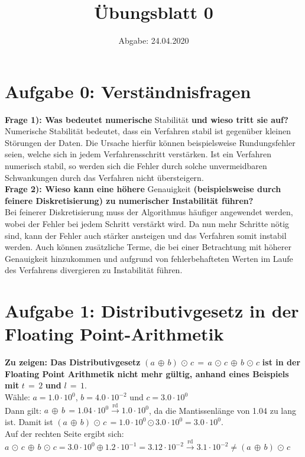 

\subject{Computational Physics}
\title{Übungsblatt 0}
\date{%
  Abgabe: 24.04.2020
}



\maketitle
\thispagestyle{empty}
\newpage

\section*{Aufgabe 0: Verständnisfragen}

\textbf{Frage 1): Was bedeutet numerische} Stabilität \textbf{und wieso tritt sie auf?}\\
Numerische Stabilität bedeutet, dass ein Verfahren stabil ist gegenüber kleinen Störungen der Daten. Die Ursache hierfür können beispielsweise Rundungsfehler seien, welche sich in jedem Verfahrensschritt verstärken. Ist ein Verfahren numerisch stabil, so werden sich die Fehler durch solche unvermeidbaren
Schwankungen durch das Verfahren nicht übersteigern. \\
\textbf{Frage 2): Wieso kann eine höhere} Genauigkeit \textbf{(beispielsweise durch feinere Diskretisierung) zu numerischer Instabilität führen?}\\
Bei feinerer Diskretisierung muss der Algorithmus häufiger angewendet werden, wobei der Fehler bei jedem Schritt verstärkt wird. Da nun mehr Schritte nötig sind, kann der Fehler auch stärker ansteigen und das Verfahren somit instabil werden. Auch können zusätzliche Terme, die bei einer Betrachtung mit höherer Genauigkeit hinzukommen und aufgrund von fehlerbehafteten Werten im Laufe des Verfahrens divergieren zu Instabilität führen.


\section*{Aufgabe 1: Distributivgesetz in der Floating Point-Arithmetik}
\textbf{Zu zeigen: Das Distributivgesetz }$(a\,\oplus\,b)\,\odot\,c\,=\,a\,\odot\,c\,\oplus\,b\,\odot\,c$\textbf{ ist in der Floating Point Arithmetik nicht mehr gültig, anhand eines Beispiels mit }$t\,=\,2$\textbf{ und }$l\,=\,1$.\\
Wähle: $a=1.0\cdot10^0$, $b=4.0\cdot10^{-2}$ und $c=3.0\cdot10^{0}$ \\
Dann gilt: $a\,\oplus\,b\,=1.04\cdot10^0\overset{\text{rd}}{\to}1.0\cdot10^0$, da die Mantissenlänge von 1.04 zu lang ist.
Damit ist $(a\,\oplus\,b)\,\odot\,c\,=1.0\cdot10^0\odot3.0\cdot10^0=3.0\cdot10^0$.\\
Auf der rechten Seite ergibt sich:\\$a\,\odot\,c\,\oplus\,b\,\odot\,c=3.0\cdot10^0\oplus1.2\cdot
10^{-1}=3.12\cdot10^{-2}\overset{\text{rd}}{\to}3.1\cdot10^{-2}\neq(a\,\oplus\,b)\,\odot\,c$

